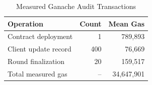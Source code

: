 \begin{table}[t]
\caption{Measured Ganache Audit Transactions}
\label{tab:blockchain_actual}
\centering
\begin{tabular}{lrr}
\toprule
Operation & Count & Mean Gas \\
\midrule
Contract deployment & 1 & 789,893 \\
Client update record & 400 & 76,669 \\
Round finalization & 20 & 159,517 \\
\midrule
Total measured gas & -- & 34,647,901 \\
\bottomrule
\end{tabular}
\end{table}
